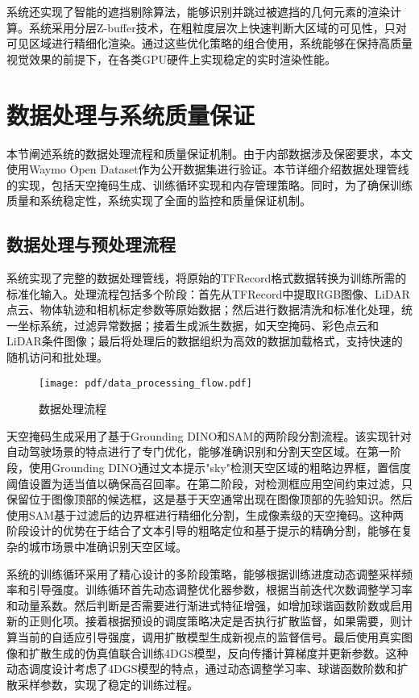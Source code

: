 系统还实现了智能的遮挡剔除算法，能够识别并跳过被遮挡的几何元素的渲染计算。系统采用分层Z-buffer技术，在粗粒度层次上快速判断大区域的可见性，只对可见区域进行精细化渲染。通过这些优化策略的组合使用，系统能够在保持高质量视觉效果的前提下，在各类GPU硬件上实现稳定的实时渲染性能。

\section{数据处理与系统质量保证}

本节阐述系统的数据处理流程和质量保证机制。由于内部数据涉及保密要求，本文使用Waymo Open Dataset作为公开数据集进行验证。本节详细介绍数据处理管线的实现，包括天空掩码生成、训练循环实现和内存管理策略。同时，为了确保训练质量和系统稳定性，系统实现了全面的监控和质量保证机制。

\subsection{数据处理与预处理流程}

系统实现了完整的数据处理管线，将原始的TFRecord格式数据转换为训练所需的标准化输入。处理流程包括多个阶段：首先从TFRecord中提取RGB图像、LiDAR点云、物体轨迹和相机标定参数等原始数据；然后进行数据清洗和标准化处理，统一坐标系统，过滤异常数据；接着生成派生数据，如天空掩码、彩色点云和LiDAR条件图像；最后将处理后的数据组织为高效的数据加载格式，支持快速的随机访问和批处理。

\begin{figure}[htbp]
  \centering
  \texttt{[image: pdf/data\_processing\_flow.pdf]}
  \caption{数据处理流程}
  \label{fig:data-processing-flow}
\end{figure}

天空掩码生成采用了基于Grounding DINO和SAM的两阶段分割流程。该实现针对自动驾驶场景的特点进行了专门优化，能够准确识别和分割天空区域。在第一阶段，使用Grounding DINO通过文本提示"sky"检测天空区域的粗略边界框，置信度阈值设置为适当值以确保高召回率。在第二阶段，对检测框应用空间约束过滤，只保留位于图像顶部的候选框，这是基于天空通常出现在图像顶部的先验知识。然后使用SAM基于过滤后的边界框进行精细化分割，生成像素级的天空掩码。这种两阶段设计的优势在于结合了文本引导的粗略定位和基于提示的精确分割，能够在复杂的城市场景中准确识别天空区域。

系统的训练循环采用了精心设计的多阶段策略，能够根据训练进度动态调整采样频率和引导强度。训练循环首先动态调整优化器参数，根据当前迭代次数调整学习率和动量系数。然后判断是否需要进行渐进式特征增强，如增加球谐函数阶数或启用新的正则化项。接着根据预设的调度策略决定是否执行扩散监督，如果需要，则计算当前的自适应引导强度，调用扩散模型生成新视点的监督信号。最后使用真实图像和扩散生成的伪真值联合训练4DGS模型，反向传播计算梯度并更新参数。这种动态调度设计考虑了4DGS模型的特点，通过动态调整学习率、球谐函数阶数和扩散采样参数，实现了稳定的训练过程。

